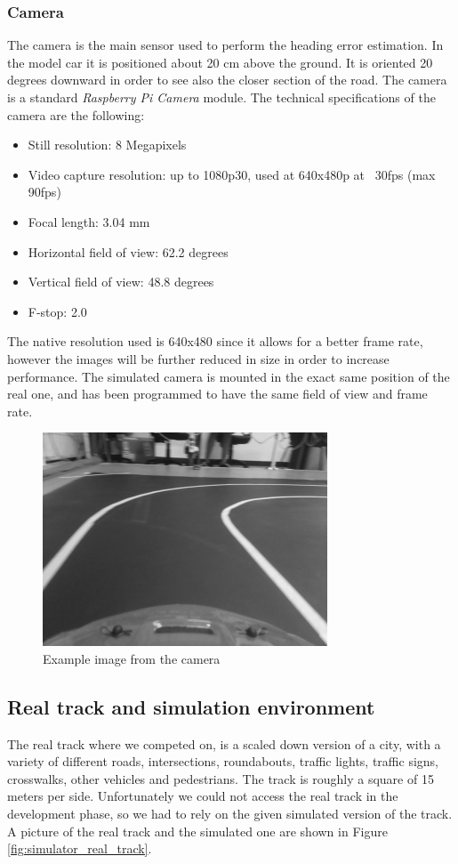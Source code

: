 \documentclass[a4paper,12pt,sort&compress]{article}
\begin{document}
    \subsubsection*{Camera}
    The camera is the main sensor used to perform the heading error estimation.
    In the model car it is positioned about 20 cm above the ground. It is oriented 20 degrees downward in order to see also the closer
    section of the road. The camera is a standard \textit{Raspberry Pi Camera}
    module. The technical specifications of the camera are the following:
    \begin{itemize}
        \item Still resolution: 8 Megapixels
        \item Video capture resolution: up to 1080p30, used at 640x480p at
        ~30fps (max 90fps)
        \item Focal length: 3.04 mm
        \item Horizontal field of view: 62.2 degrees
        \item Vertical field of view: 48.8 degrees
        \item F-stop: 2.0
    \end{itemize}
    The native resolution used is 640x480 since it allows for a better
    frame rate, however the images will be further reduced in size in order to
    increase performance. The simulated camera is mounted in the exact same
    position of the real one, and has been programmed to have the same field of
    view and frame rate.  

    \begin{figure}
        \centering
        \includegraphics[width=0.6\linewidth]{imgs/example_img.png}
        \caption{Example image from the camera}
        \label{fig:camera_example}
    \end{figure}
    

\subsection{Real track and simulation environment}
    The real track where we competed on, is a scaled down version of a city, with a variety of
    different roads, intersections, roundabouts, traffic lights, traffic signs, crosswalks, other
    vehicles and pedestrians. The track is roughly a square of 15 meters per side. Unfortunately we
    could not access the real track in the development phase, so we had to rely on the given
    simulated version of the track. A picture of the real track and the simulated one are shown in
    Figure \ref{fig:simulator_real_track}.
\end{document}
